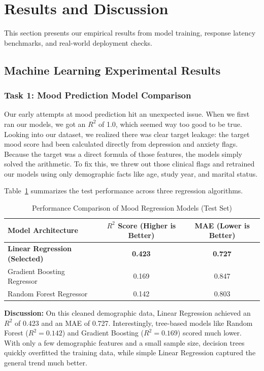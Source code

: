 \section{Results and Discussion}
This section presents our empirical results from model training, response latency benchmarks, and real-world deployment checks.

\subsection{Machine Learning Experimental Results}

\subsubsection{Task 1: Mood Prediction Model Comparison}
Our early attempts at mood prediction hit an unexpected issue. When we first ran our models, we got an $R^2$ of 1.0, which seemed way too good to be true. Looking into our dataset, we realized there was clear target leakage: the target mood score had been calculated directly from depression and anxiety flags. Because the target was a direct formula of those features, the models simply solved the arithmetic. To fix this, we threw out those clinical flags and retrained our models using only demographic facts like age, study year, and marital status.

Table~\ref{tab:mood_results} summarizes the test performance across three regression algorithms.

\begin{table}[H]
\centering
\caption{Performance Comparison of Mood Regression Models (Test Set)}
\label{tab:mood_results}
\begin{tabular}{lcc}
\toprule
\textbf{Model Architecture} & \textbf{$R^2$ Score (Higher is Better)} & \textbf{MAE (Lower is Better)} \\
\midrule
\textbf{Linear Regression (Selected)} & \textbf{0.423} & \textbf{0.727} \\
Gradient Boosting Regressor           & 0.169          & 0.847          \\
Random Forest Regressor               & 0.142          & 0.803          \\
\bottomrule
\end{tabular}
\end{table}

\noindent \textbf{Discussion:} On this cleaned demographic data, Linear Regression achieved an $R^2$ of 0.423 and an MAE of 0.727. Interestingly, tree-based models like Random Forest ($R^2 = 0.142$) and Gradient Boosting ($R^2 = 0.169$) scored much lower. With only a few demographic features and a small sample size, decision trees quickly overfitted the training data, while simple Linear Regression captured the general trend much better.

